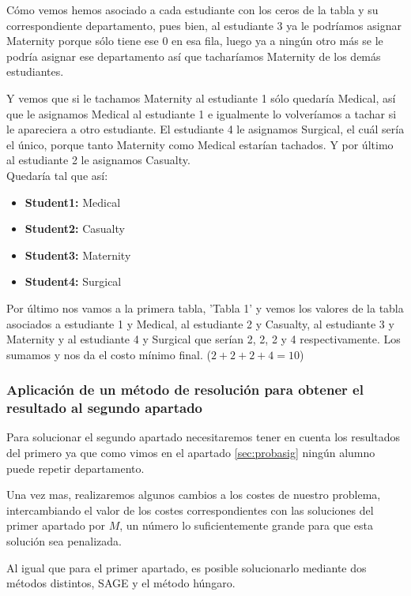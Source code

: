 \documentclass[11pt]{article}
\begin{document}
Cómo vemos hemos asociado a cada estudiante con los ceros de la tabla y su correspondiente departamento, pues bien, al estudiante 3 ya le podríamos asignar Maternity porque sólo tiene ese 0 en esa fila, luego ya a ningún otro más se le podría asignar ese departamento así que tacharíamos Maternity de los demás estudiantes.

Y vemos que si le tachamos Maternity al estudiante 1 sólo quedaría Medical, así que le asignamos Medical al estudiante 1 e igualmente lo volveríamos a tachar si le apareciera a otro estudiante. El estudiante 4 le asignamos Surgical, el cuál sería el único, porque tanto Maternity como Medical estarían tachados. Y por último al estudiante 2 le asignamos Casualty.\\

Quedaría tal que así: 
\begin{itemize}
    \item \textbf{Student1:} Medical
    \item \textbf{Student2:} Casualty
    \item \textbf{Student3:} Maternity
    \item \textbf{Student4:} Surgical
\end{itemize}{}

Por último nos vamos a la primera tabla, 'Tabla 1' y vemos los valores de la tabla asociados a estudiante 1 y Medical, al estudiante 2 y Casualty, al estudiante 3 y Maternity y al estudiante 4 y Surgical que serían 2, 2, 2 y 4 respectivamente. Los sumamos y nos da el costo mínimo final. ($2+2+2+4 = 10$)




\subsubsection{Aplicación de un método de resolución para obtener el resultado al segundo apartado}

Para solucionar el segundo apartado necesitaremos tener en cuenta los resultados del primero ya que como vimos en el apartado \ref{sec:probasig} ningún alumno puede repetir departamento.

Una vez mas,  realizaremos algunos cambios a los costes de nuestro problema, intercambiando el valor de los costes correspondientes con las soluciones del primer apartado por $M$, un número lo suficientemente grande para que esta solución sea penalizada.

Al igual que para el primer apartado, es posible solucionarlo mediante dos métodos distintos, SAGE y el método húngaro.
\end{document}
